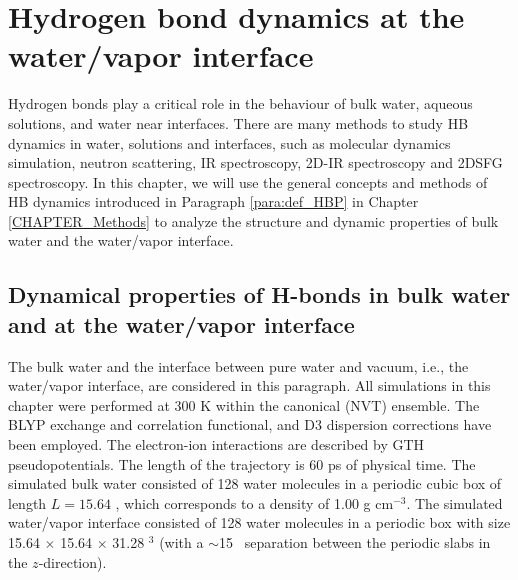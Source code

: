 \chapter{Hydrogen bond dynamics at the water/vapor interface}\label{CHAPTER_HBD}
Hydrogen bonds play a critical role in the behaviour of bulk water\cite{Eisenberg1969,Teixeira1993,Luzar1996}, 
aqueous solutions\cite{Naslund2005}, and water near interfaces\cite{Chowdhary2008}.
There are many methods to study HB dynamics in water, solutions and interfaces, 
such as molecular dynamics simulation\cite{Tongraar2006,Chanda2006,Tongraar2010,Chowdhary2008,Banerjee2016}, neutron scattering\cite{ChenSH1984,Teixeira1990}, 
IR spectroscopy\cite{Werhahn2011,Fournier2016}, 2D-IR spectroscopy\cite{Auer2007,Kim2009} and 2DSFG spectroscopy\cite{ZhangZhen2011}.
In this chapter, we will use the general concepts and methods of HB dynamics \cite{AL96,Luzar1996,DC87} introduced in Paragraph \ref{para:def_HBP} 
in Chapter \ref{CHAPTER_Methods} to analyze the structure and dynamic properties of bulk water and the water/vapor interface. 

%
\FloatBarrier
\section{Dynamical properties of H-bonds in bulk water and at the water/vapor interface}
The bulk water and the interface between pure water and vacuum, i.e., the water/vapor interface, 
are considered in this paragraph.
All simulations in this chapter were performed at 300 K within the canonical (NVT) ensemble.
The BLYP exchange and correlation functional\cite{Becke1988,LeeC1988}, 
and D3 dispersion corrections\cite{Grimme2010,Klimes2012} have been employed.
The electron-ion interactions are described by GTH pseudopotentials\cite{Hartwigsen1998,Lippert1999}.
The length of the trajectory is 60 ps of physical time.
The simulated bulk water consisted of 128 water molecules in a periodic cubic box of length $L = 15.64$ \A, which corresponds to a density of 1.00 g cm$^{-3}$.
The simulated water/vapor interface consisted of 128 water molecules in a periodic box with size 15.64 $\times$ 15.64 $\times$ 31.28 \A$^3$ (with a $\sim$15 \A 
\ separation between the periodic slabs in the $z$-direction).

